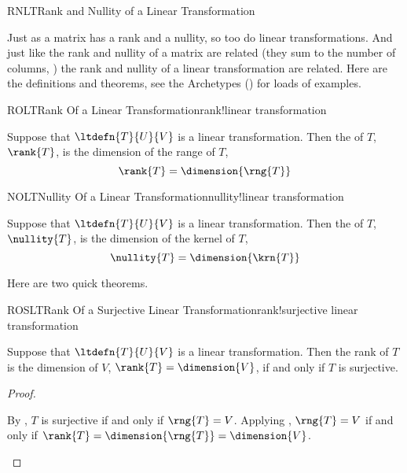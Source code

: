 \begin{subsect}{RNLT}{Rank and Nullity of a Linear Transformation}
%
\begin{para}Just as a matrix has a rank and a nullity, so too do linear transformations.  And just like the rank and nullity of a matrix are related (they sum to the number of columns, ) the rank and nullity of a linear transformation are related.  Here are the definitions and theorems, see the Archetypes () for loads of examples.\end{para}
%
\begin{definition}{ROLT}{Rank Of a Linear Transformation}{rank!linear transformation}
\begin{para}Suppose that $\ltdefn{T}{U}{V}$ is a linear transformation.  Then the  of $T$, $\rank{T}$, is the dimension of the range of $T$,
%
\begin{equation*}
\rank{T}=\dimension{\rng{T}}
\end{equation*}\end{para}
%
\end{definition}
%
\begin{definition}{NOLT}{Nullity Of a Linear Transformation}{nullity!linear transformation}
\begin{para}Suppose that $\ltdefn{T}{U}{V}$ is a linear transformation.  Then the  of $T$, $\nullity{T}$, is the dimension of the kernel of $T$,
%
\begin{equation*}
\nullity{T}=\dimension{\krn{T}}
\end{equation*}\end{para}
%
\end{definition}
%
\begin{para}Here are two quick theorems.\end{para}
%
\begin{theorem}{ROSLT}{Rank Of a Surjective Linear Transformation}{rank!surjective linear transformation}
\begin{para}Suppose that $\ltdefn{T}{U}{V}$ is a linear transformation.  Then the rank of $T$ is the dimension of $V$, $\rank{T}=\dimension{V}$, if and only if $T$ is surjective.\end{para}
\end{theorem}
%
\begin{proof}
\begin{para}By , $T$ is surjective if and only if $\rng{T}=V$.  Applying , $\rng{T}=V$ if and only if $\rank{T}=\dimension{\rng{T}}=\dimension{V}$.\end{para}

\end{proof}
\end{subsect}
